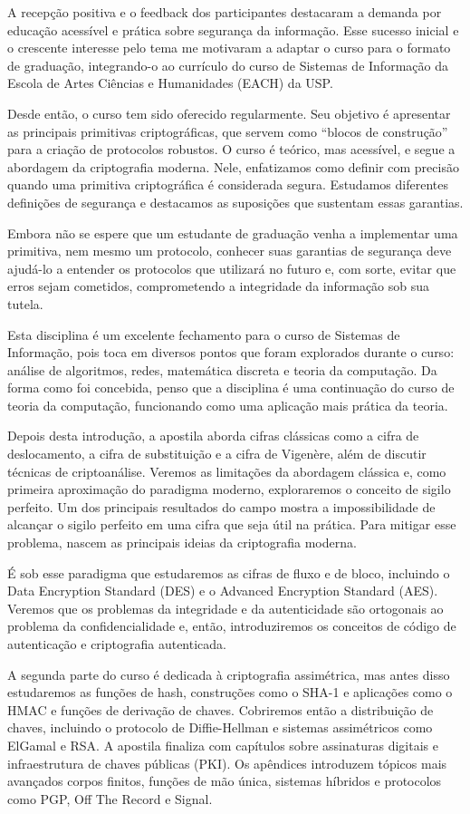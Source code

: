 A recepção positiva e o feedback dos participantes destacaram a demanda por educação acessível e prática sobre segurança da informação.
Esse sucesso inicial e o crescente interesse pelo tema me motivaram a adaptar o curso para o formato de graduação, integrando-o ao currículo do curso de Sistemas de Informação da Escola de Artes Ciências e Humanidades (EACH) da USP.

Desde então, o curso tem sido oferecido regularmente.
Seu objetivo é apresentar as principais primitivas criptográficas, que servem como ``blocos de construção'' para a criação de protocolos robustos.
O curso é teórico, mas acessível, e segue a abordagem da criptografia moderna.
Nele, enfatizamos como definir com precisão quando uma primitiva criptográfica é considerada segura.
Estudamos diferentes definições de segurança e destacamos as suposições que sustentam essas garantias.

Embora não se espere que um estudante de graduação venha a implementar uma primitiva, nem mesmo um protocolo, conhecer suas garantias de segurança deve ajudá-lo a entender os protocolos que utilizará no futuro e, com sorte, evitar que erros sejam cometidos, comprometendo a integridade da informação sob sua tutela.

Esta disciplina é um excelente fechamento para o curso de Sistemas de Informação, pois toca em diversos pontos que foram explorados durante o curso: análise de algoritmos, redes, matemática discreta e teoria da computação.
Da forma como foi concebida, penso que a disciplina é uma continuação do curso de teoria da computação, funcionando como uma aplicação mais prática da teoria.

Depois desta introdução, a apostila aborda cifras clássicas como a cifra de deslocamento, a cifra de substituição e a cifra de Vigenère, além de discutir técnicas de criptoanálise.
Veremos as limitações da abordagem clássica e, como primeira aproximação do paradigma moderno, exploraremos o conceito de sigilo perfeito.
Um dos principais resultados do campo mostra a impossibilidade de alcançar o sigilo perfeito em uma cifra que seja útil na prática.
Para mitigar esse problema, nascem as principais ideias da criptografia moderna.

É sob esse paradigma que estudaremos as cifras de fluxo e de bloco, incluindo o Data Encryption Standard (DES) e o Advanced Encryption Standard (AES).
Veremos que os problemas da integridade e da autenticidade são ortogonais ao problema da confidencialidade e, então, introduziremos os conceitos de código de autenticação e criptografia autenticada.

A segunda parte do curso é dedicada à criptografia assimétrica, mas antes disso estudaremos as funções de hash, construções como o SHA-1 e aplicações como o HMAC e funções de derivação de chaves.
Cobriremos então a distribuição de chaves, incluindo o protocolo de Diffie-Hellman e sistemas assimétricos como ElGamal e RSA.
A apostila finaliza com capítulos sobre assinaturas digitais e infraestrutura de chaves públicas (PKI).
Os apêndices introduzem tópicos mais avançados corpos finitos, funções de mão única, sistemas híbridos e protocolos como PGP, Off The Record e Signal.

